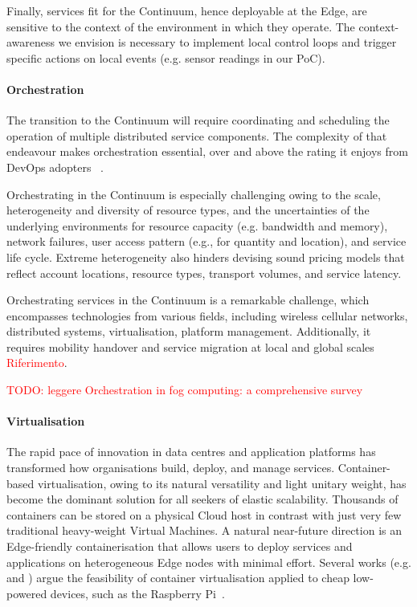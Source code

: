 Finally, services fit for the Continuum, hence deployable at the Edge, are sensitive to the context of the environment in which they operate.
The context-awareness we envision is necessary to implement local control loops and trigger specific actions on local events (e.g. sensor readings in our PoC).

\paragraph{Orchestration}
The transition to the Continuum will require coordinating and scheduling the operation of multiple distributed service components. The complexity of that endeavour makes orchestration essential, over and above the rating it enjoys from DevOps adopters~ \textcolor{red}{\cite{nygren2010akamai}}. 

Orchestrating in the Continuum is especially challenging owing to the scale, heterogeneity and diversity of resource types, and the uncertainties of the underlying environments for resource capacity (e.g. bandwidth and memory), network failures, user access pattern (e.g., for quantity and location), and service life cycle.
Extreme heterogeneity also hinders devising sound pricing models that reflect account locations, resource types, transport volumes, and service latency.

Orchestrating services in the Continuum is a remarkable challenge, which encompasses technologies from various fields, including wireless cellular networks, distributed systems, virtualisation, platform management. Additionally, it requires mobility handover and service migration at local and global scales \textcolor{red}{Riferimento}.

\textcolor{red}{TODO: leggere Orchestration in fog computing: a comprehensive survey}

\paragraph{Virtualisation}
\label{sec:virtualisation}

The rapid pace of innovation in data centres and application platforms has transformed how organisations build, deploy, and manage services.
Container-based virtualisation, owing to its natural versatility and light unitary weight, has become the dominant solution for all seekers of elastic scalability.
Thousands of containers can be stored on a physical Cloud host in contrast with just very few traditional heavy-weight Virtual Machines. 
A natural near-future direction is an Edge-friendly containerisation that allows users to deploy services and applications on heterogeneous Edge nodes with minimal effort. 
Several works (e.g. \cite{pahl2016container} and \cite{bellavista2017feasibility}) argue the feasibility of container virtualisation applied to cheap low-powered devices, such as the Raspberry Pi~\cite{raspberry}. 


